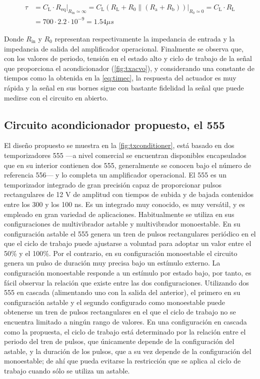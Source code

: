 \begin{equation}\label{eq:timec}
	\begin{split}
		\tau &= C_\text{L}\cdot R_\text{eq}
		\Big|_{R_\text{in}\simeq\infty} =
		C_\text{L}\left(R_\text{L} + R_0\|(R_\text{a} +
		R_\text{b})\right)\Big|_{R_0 \simeq 0} =
		C_\text{L}\cdot R_\text{L} \\
		&= 700\cdot2.2\cdot 10^{-9} = 1.54\mu s
	\end{split}
\end{equation}

Donde $R_\text{in}$ y $R_\text{0}$ representan respectivamente la
impedancia de entrada y la impedancia de salida del amplificador
operacional. Finalmente se observa que, con los valores de periodo, tensión
en el estado alto y ciclo de trabajo de la señal que proporciona el
acondicionador (\cref{fig:txacvo}), y considerando una constante de tiempos
como la obtenida en la \cref{eq:timec}, la respuesta del actuador es muy
rápida y la señal en sus bornes sigue con bastante fidelidad la señal que
puede medirse con el circuito en abierto.


\subsection[Circuito acondicionador propuesto]{Circuito acondicionador
propuesto, el 555}

El diseño propuesto se muestra en la \cref{fig:txconditioner}, está basado
en dos temporizadores 555 ---a nivel comercial se encuentran disponibles
encapsulados que en su interior contienen dos 555, generalmente se conocen
bajo el número de referencia 556--- y lo completa un amplificador
operacional. El 555 es un temporizador integrado de gran precisión capaz de
proporcionar pulsos rectangulares de 12 V de amplitud con tiempos de subida
y de bajada contenidos entre los 300 y los 100 ns. Es un integrado muy
conocido, es muy versátil, y es empleado en gran variedad de aplicaciones.
Habitualmente se utiliza en sus configuraciones de multivibrador astable y
multivibrador monoestable. En su configuración astable el 555 genera un
tren de pulsos rectangulares periódico en el que el ciclo de trabajo puede
ajustarse a voluntad para adoptar un valor entre el 50\% y el 100\%. Por el
contrario, en su configuración monoestable el circuito genera un pulso de
duración muy precisa bajo un estímulo externo. La configuración monoestable
responde a un estímulo por estado bajo, por tanto, es fácil observar la
relación que existe entre las dos configuraciones. Utilizando dos 555 en
cascada (alimentando uno con la salida del anterior), el primero en su
configuración astable y el segundo configurado como monoestable puede
obtenerse un tren de pulsos rectangulares en el que el ciclo de trabajo no
se encuentra limitado a ningún rango de valores. En una configuración en
cascada como la propuesta, el ciclo de trabajo está determinado por la
relación entre el periodo del tren de pulsos, que únicamente depende de la
configuración del astable, y la duración de los pulsos, que a su vez
depende de la configuración del monoestable; de ahí que pueda evitarse la
restricción que se aplica al ciclo de trabajo cuando sólo se utiliza un
astable.

